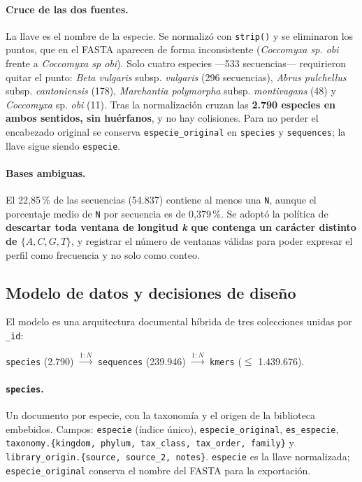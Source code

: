 \documentclass[journal]{IEEEtran}
\begin{document}
\paragraph*{Cruce de las dos fuentes.}
La llave es el nombre de la especie. Se normalizó con \texttt{strip()} y se eliminaron los
puntos, que en el FASTA aparecen de forma inconsistente (\textit{Coccomyxa sp. obi} frente
a \textit{Coccomyxa sp obi}). Solo cuatro especies ---533 secuencias--- requirieron quitar
el punto: \textit{Beta vulgaris} subsp. \textit{vulgaris} (296 secuencias), \textit{Abrus
pulchellus} subsp. \textit{cantoniensis} (178), \textit{Marchantia polymorpha} subsp.
\textit{montivagans} (48) y \textit{Coccomyxa} sp. \textit{obi} (11). Tras la normalización
cruzan las \textbf{2.790 especies en ambos sentidos, sin huérfanos}, y no hay colisiones.
Para no perder el encabezado original se conserva \texttt{especie\_original} en
\texttt{species} y \texttt{sequences}; la llave sigue siendo \texttt{especie}.

\paragraph*{Bases ambiguas.}
El 22,85\,\% de las secuencias (54.837) contiene al menos una \texttt{N}, aunque el
porcentaje medio de \texttt{N} por secuencia es de 0,379\,\%. Se adoptó la política de
\textbf{descartar toda ventana de longitud \textit{k} que contenga un carácter distinto de
$\{A, C, G, T\}$}, y registrar el número de ventanas válidas para poder expresar el perfil
como frecuencia y no solo como conteo.

\subsection{Modelo de datos y decisiones de diseño}
\label{sec:modelo}
El modelo es una arquitectura documental híbrida de tres colecciones unidas por
\texttt{\_id}:
\begin{center}
\texttt{species} (2.790) $\xrightarrow{1:N}$ \texttt{sequences} (239.946)
$\xrightarrow{1:N}$ \texttt{kmers} ($\leq$ 1.439.676).
\end{center}

\paragraph*{\texttt{species}.}
Un documento por especie, con la taxonomía y el origen de la biblioteca embebidos. Campos:
\texttt{especie} (índice único), \texttt{especie\_original}, \texttt{es\_especie},
\texttt{taxonomy.\{kingdom, phylum, tax\_class, tax\_order, family\}} y
\texttt{library\_origin.\{source, source\_2, notes\}}. \texttt{especie} es la llave normalizada;
\texttt{especie\_original} conserva el nombre del FASTA para la exportación.
\end{document}
